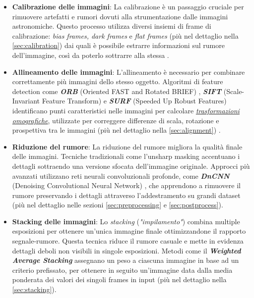 \begin{itemize}
\item \textbf{Calibrazione delle immagini}: La calibrazione è un passaggio cruciale per rimuovere artefatti e rumori dovuti alla strumentazione dalle immagini astronomiche. Questo processo utilizza diversi insiemi di frame di calibrazione: \textit{bias frames, dark frames} e \textit{flat frames} (più nel dettaglio nella \cref{sec:calibration}) dai quali è possibile estrarre informazioni sul rumore dell'immagine, così da poterlo sottrarre alla stessa \cite{calibration_1} \cite{calibration_2}.

\item \textbf{Allineamento delle immagini}: L'allineamento è necessario per combinare correttamente più immagini dello stesso oggetto. Algoritmi di feature detection come \textit{\textbf{ORB}} (Oriented FAST and Rotated BRIEF) \cite{orb}, \textit{\textbf{SIFT}} (Scale-Invariant Feature Transform) e \textit{\textbf{SURF}} (Speeded Up Robust Features) identificano punti caratteristici nelle immagini per calcolare \hyperref[subsec:homography]{\textit{trasformazioni omografiche}}, utilizzate per correggere differenze di scala, rotazione e prospettiva tra le immagini (più nel dettaglio nella \cref{sec:alignment}) \cite{multiwavelength_image_proc} \cite{calibration_2}.

\item \textbf{Riduzione del rumore}: La riduzione del rumore migliora la qualità finale delle immagini. Tecniche tradizionali come l'unsharp masking \cite{multiwavelength_image_proc} accentuano i dettagli sottraendo una versione sfocata dell'immagine originale. Approcci più avanzati utilizzano reti neurali convoluzionali profonde, come \textit{\textbf{DnCNN}} (Denoising Convolutional Neural Network) \cite{DnCnn}, che apprendono a rimuovere il rumore preservando i dettagli attraverso l'addestramento su grandi dataset (più nel dettaglio nelle sezioni \ref{sec:preprocessing} e \ref{sec:postprocess}).

\item \textbf{Stacking delle immagini}: Lo \textit{stacking} (\textit{"impilamento"}) combina multiple esposizioni per ottenere un'unica immagine finale ottimizzandone il rapporto segnale-rumore. Questa tecnica riduce il rumore casuale e mette in evidenza dettagli deboli non visibili in singole esposizioni. Metodi come il \textbf{\textit{Weighted Average Stacking}} assegnano un peso a ciascuna immagine in base ad un criterio prefissato, per ottenere in seguito un'immagine data dalla media ponderata dei valori dei singoli frames in input (più nel dettaglio nella \cref{sec:stacking}).
\end{itemize}

